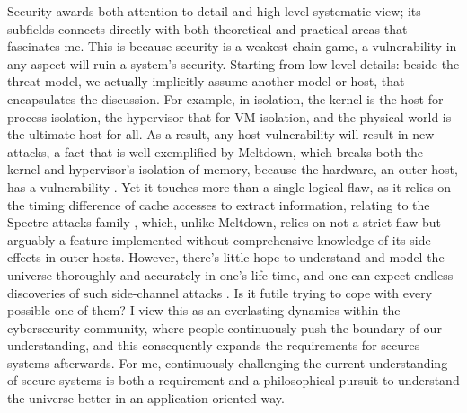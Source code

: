 \documentclass[10pt]{article}
\begin{document}
Security awards both attention to detail and high-level systematic view; its
subfields connects directly with both theoretical and practical areas that
fascinates me. This is because security is a weakest chain game, a
vulnerability in any aspect will ruin a system's security. Starting from
low-level details: beside the threat model, we actually implicitly assume
another model or host, that encapsulates the discussion. For
example, in isolation, the kernel is the host for process isolation, the
hypervisor that for VM isolation, and the physical world is the ultimate
host for all. As a result, any host vulnerability will result in new attacks,
a fact that is well exemplified by Meltdown, which breaks both the kernel and
hypervisor's isolation of memory, because the hardware, an outer host, has a
vulnerability \cite{meltdown}. Yet it touches more than a single logical flaw,
as it relies on the timing difference of cache accesses to extract information,
relating to the Spectre attacks family \cite{spectre}, which, unlike Meltdown,
relies on not a strict flaw but arguably a feature implemented without
comprehensive knowledge of its side effects in outer hosts. 
However, there's little hope to understand and model the universe thoroughly
and accurately in one's life-time, and one can expect endless discoveries of
such side-channel attacks \cite{side.channel.1, side.channel.2,
side.channel.3}. Is it futile trying to cope with every possible one of them? I
view this as an everlasting dynamics within the cybersecurity community, where
people continuously push the boundary of our understanding, and this
consequently expands the requirements for secures systems afterwards. For me,
continuously challenging the current understanding of secure systems is both a
requirement and a philosophical pursuit to understand the universe better in an
application-oriented way.
\end{document}
